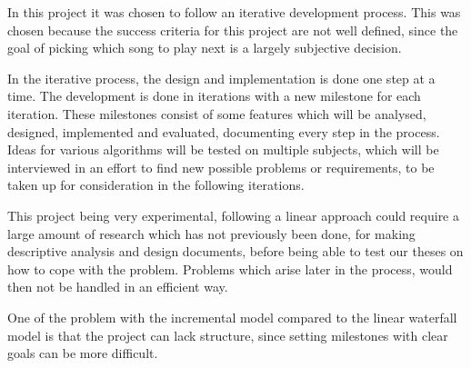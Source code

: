 In this project it was chosen to follow an iterative development process. This was chosen because the success criteria for this project are not well defined, since the goal of picking which song to play next is a largely subjective decision.

In the iterative process, the design and implementation is done one step at a time. The development is done in iterations with a new milestone for each iteration. These milestones consist of some features which will be analysed, designed, implemented and evaluated, documenting every step in the process. Ideas for various algorithms will be tested on multiple subjects, which will be interviewed in an effort to find new possible problems or requirements, to be taken up for consideration in the following iterations.

This project being very experimental, following a linear approach could require a large amount of research which has not previously been done, for making descriptive analysis and design documents, before being able to test our theses on how to cope with the problem. Problems which arise later in the process, would then not be handled in an efficient way.

One of the problem with the incremental model compared to the linear waterfall model is that the project can lack structure, since setting milestones with clear goals can be more difficult.



